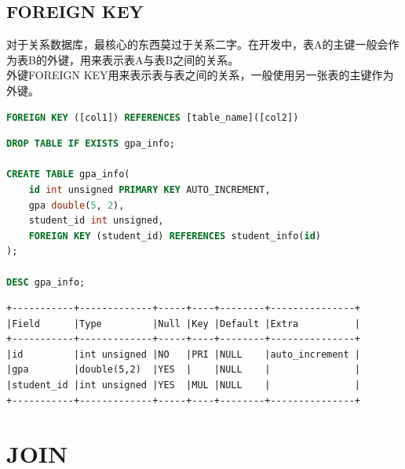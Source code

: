 \documentclass[12pt, openany, oneside]{book}
\begin{document}
\vspace{0.5cm}

\section{FOREIGN KEY}

对于关系数据库，最核心的东西莫过于关系二字。在开发中，表A的主键一般会作为表B的外键，用来表示表A与表B之间的关系。\\

外键FOREIGN KEY用来表示表与表之间的关系，一般使用另一张表的主键作为外键。

\vspace{-0.5cm}

\begin{lstlisting}[language=SQL]
FOREIGN KEY ([col1]) REFERENCES [table_name]([col2])
\end{lstlisting}

\vspace{0.5cm}


\begin{lstlisting}[language=SQL]
DROP TABLE IF EXISTS gpa_info;

CREATE TABLE gpa_info(
    id int unsigned PRIMARY KEY AUTO_INCREMENT,
    gpa double(5, 2),
    student_id int unsigned,
    FOREIGN KEY (student_id) REFERENCES student_info(id)
);

DESC gpa_info;
\end{lstlisting}

\begin{tcolorbox}
	\begin{verbatim}
+-----------+-------------+-----+----+--------+---------------+
|Field      |Type         |Null |Key |Default |Extra          |
+-----------+-------------+-----+----+--------+---------------+
|id         |int unsigned |NO   |PRI |NULL    |auto_increment |
|gpa        |double(5,2)  |YES  |    |NULL    |               |
|student_id |int unsigned |YES  |MUL |NULL    |               |
+-----------+-------------+-----+----+--------+---------------+
	\end{verbatim}
\end{tcolorbox}

\newpage

\chapter{JOIN}
\end{document}
